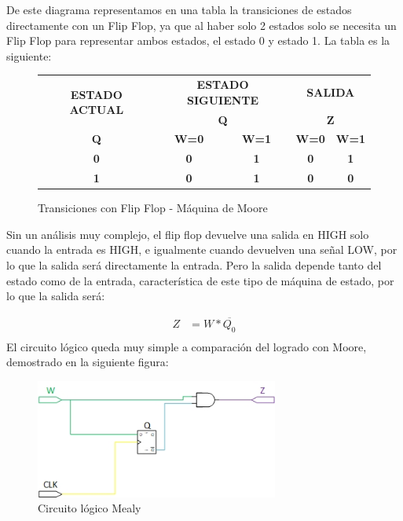 De este diagrama representamos en una tabla la transiciones de estados directamente con un Flip Flop, ya que al haber solo 2 estados solo se necesita un Flip Flop para representar ambos estados, el estado 0 y estado 1. La tabla es la siguiente:

\begin{figure}[H]
	\begin{center}
		\begin{tabular}{|c|c|c|c|c|}
\hline
\multirow{2}{*}{\textbf{ESTADO ACTUAL}} & \multicolumn{2}{c|}{\textbf{ESTADO SIGUIENTE}} & \multicolumn{2}{c|}{\textbf{SALIDA}} \\ \cline{2-5} 
 & \multicolumn{2}{c|}{\textbf{Q}} & \multicolumn{2}{c|}{\textbf{Z}} \\ \hline
\textbf{Q} & \textbf{W=0} & \textbf{W=1} & \textbf{W=0} & \textbf{W=1} \\ \hline
\textbf{0} & \textbf{0} & \textbf{1} & \textbf{0} & \textbf{1} \\ \hline
\textbf{1} & \textbf{0} & \textbf{1} & \textbf{0} & \textbf{0} \\ \hline
		\end{tabular}
		\caption{Transiciones con Flip Flop - Máquina de Moore} 
		\label{3_fig8}
	\end{center}
\end{figure}

Sin un análisis muy complejo, el flip flop devuelve una salida en HIGH solo cuando la entrada es HIGH, e igualmente cuando devuelven una señal LOW, por lo que la salida será directamente la entrada. Pero la salida depende tanto del estado como de la entrada, característica de este tipo de máquina de estado, por lo que la salida será:

\begin{align*}
	Z &= W * \overline{Q_{0}} \\
\end{align*}
El circuito lógico queda muy simple a comparación del logrado con Moore, demostrado en la siguiente figura:

\begin{figure}[H]
	\centering
	\includegraphics[width=8cm]{Imagenes/circej3mealy.jpg}
	\caption{Circuito lógico Mealy}
\end{figure}


